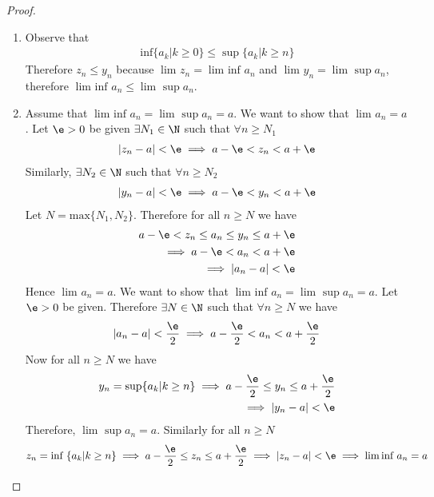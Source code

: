 \begin{proof}
	\begin{enumerate}
		\item Observe that 
			\begin{align}
				\text{inf}\{a_k | k \ge 0\} \le \sup \{a_k | k \ge n\} 
			\end{align}
		Therefore $z_n \le y_n$ because $\lim_{} z_n = \lim_{} \text{inf } a_n$ and $\lim_{} y_n = \lim_{} \sup a_n$, therefore $\lim_{} \text{inf } a_n \le \lim_{} \sup a_n$.
		\item Assume that $\lim_{} \text{inf } a_n = \lim_{} \sup a_n = a$. We want to show that $\lim_{} a_n = a$. Let $\e > 0$ be given $\exists N_1 \in \N$ such that $\forall n \ge N_1$
			\begin{align}
				\left|z_n - a\right| < \e \implies a - \e < z_n < a + \e
			\end{align}
		Similarly, $\exists N_2 \in \N$ such that $\forall n \ge N_2$ 
		\begin{align}
			\left|y_n - a\right| < \e \implies a - \e < y_n < a + \e
		\end{align}
		Let $N = \text{max} \{N_1, N_2\} $. Therefore for all $n \ge N$ we have 
		\begin{align}
			a-\e < z_n \le a_n \le y_n \le a + \e \\
			\implies a - \e < a_n < a + \e \\
			\implies \left|a_n - a\right| < \e
		\end{align}
		Hence $\lim_{} a_n = a$. We want to show that $\lim_{} \text{inf } a_n = \lim_{} \sup a_n = a$. Let $\e > 0$ be given. Therefore $\exists N \in \N$ such that $\forall n \ge N$ we have
		\begin{align}
			\left|a_n - a\right| < \frac{\e}{2} \implies a - \frac{\e}{2} < a_n < a + \frac{\e}{2}
		\end{align}
		Now for all $n \ge N$ we have
		\begin{align}
			y_n = \sup \{a_k | k \ge n\} \implies a - \frac{\e}{2} \le y_n \le a + \frac{\e}{2} \\
			\implies \left|y_n - a\right| < \e
		\end{align}
		Therefore, $\lim_{} \sup a_n = a$. Similarly for all $n \ge N$ 
		\begin{align}
			z_n = \text{inf } \{a_k | k \ge n\} \implies a - \frac{\e}{2} \le z_n \le a + \frac{\e}{2} \implies \left|z_n - a\right| < \e \implies \lim_{} \text{inf } a_n = a
		\end{align}
	\end{enumerate}
\end{proof}

